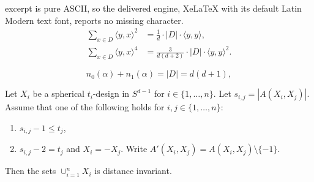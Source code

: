 \documentclass[10pt,a4paper]{amsart}
\begin{document}
excerpt is pure ASCII, so the delivered engine, XeLaTeX with its default Latin Modern text font, reports no missing character.
\begin{align}
\sum_{x\in D}\langle y,x \rangle^2&=\frac{1}{d}\cdot |D|\cdot \langle y,y \rangle,\label{sperical5design-2} \\
\sum_{x\in D}\langle y,x \rangle^4&=\frac{3}{d(d+2)}\cdot |D|\cdot\langle y,y \rangle^2 \label{sperical5design-4}.
\end{align}

\begin{equation}\label{sum}
n_0(\alpha)+n_1(\alpha)=|D|=d(d+1),
\end{equation}

\begin{theorem}\label{thm:di}
    Let $X_i$ be a spherical $t_i$-design in $S^{d-1}$ for $i\in\{1,\ldots,n\}$.  
    Let $s_{i,j}=|A(X_i,X_j)|$. 
    Assume that one of the following holds for $i,j\in\{1,\ldots,n\}$:
    \begin{enumerate}
        \item[{\rm (i)}] $s_{i,j}-1\leq t_j$,
        \item[{\rm (ii)}] $s_{i,j}-2= t_j$ and $X_i=-X_j$. Write $A'(X_i,X_j)=A(X_i,X_j)\setminus\{-1\}$. 
    \end{enumerate}
    Then the sets $\cup_{i=1}^n X_i$ is distance invariant.
\end{theorem}
\end{document}
